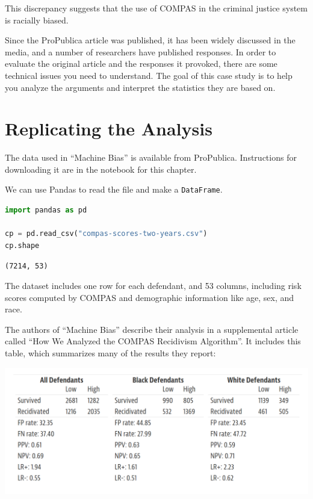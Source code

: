 This discrepancy suggests that the use of COMPAS in the criminal justice
system is racially biased.

Since the ProPublica article was published, it has been widely discussed
in the media, and a number of researchers have published responses. In
order to evaluate the original article and the responses it provoked,
there are some technical issues you need to understand. The goal of this
case study is to help you analyze the arguments and interpret the
statistics they are based on.

\hypertarget{replicating-the-analysis}{%
\section{Replicating the Analysis}\label{replicating-the-analysis}}

The data used in ``Machine Bias'' is available from ProPublica.
Instructions for downloading it are in the notebook for this chapter.

We can use Pandas to read the file and make a
\passthrough{\lstinline!DataFrame!}.

\begin{lstlisting}[language=Python,style=source]
import pandas as pd

cp = pd.read_csv("compas-scores-two-years.csv")
cp.shape
\end{lstlisting}

\begin{lstlisting}[style=output]
(7214, 53)
\end{lstlisting}

The dataset includes one row for each defendant, and 53 columns,
including risk scores computed by COMPAS and demographic information
like age, sex, and race.

The authors of ``Machine Bias'' describe their analysis in a
supplemental article called ``How We Analyzed the COMPAS Recidivism
Algorithm''. It includes this table, which summarizes many of the
results they report:

\includegraphics{chapters/figs/machine_bias_table.png}

